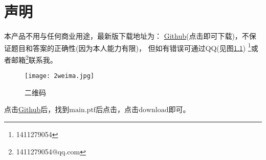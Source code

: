 \chapter{声明}
本产品不用与任何商业用途，最新版下载地址为：
\href{https://github.com}{Github}(点击即可下载)，不保证题目和答案的正确性(因为本人能力有限)，
但如有错误可通过QQ(见图\ref{fig:1}) \footnote{1411279054}或者邮箱\footnote{1411279054@qq.com}联系我。
\begin{figure}[htbp]
	\centering
	\texttt{[image: 2weima.jpg]}
	\caption{二维码}\label{fig:1}
\end{figure}

点击\href{https://github.com}{Github}后，找到$\mathrm{main.ptf}$后点击，点击$\mathrm{download}$即可。